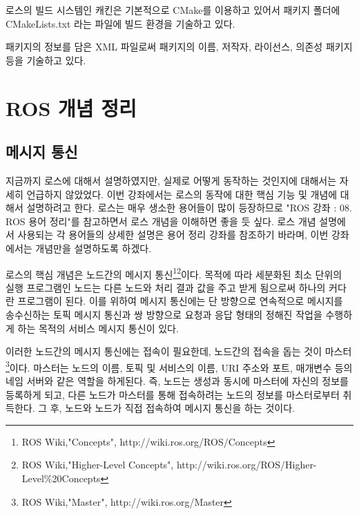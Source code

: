 \begin{definition}
로스의 빌드 시스템인 캐킨은 기본적으로 CMake를 이용하고 있어서 패키지 폴더에 CMakeLists.txt 라는 파일에 빌드 환경을 기술하고 있다.
\end{definition}

\begin{definition}
패키지의 정보를 담은 XML 파일로써 패키지의 이름, 저작자, 라이선스, 의존성 패키지 등을 기술하고 있다.
\end{definition}

\section{ROS 개념 정리}

\subsection{메시지 통신}

지금까지 로스에 대해서 설명하였지만, 실제로 어떻게 동작하는 것인지에 대해서는 자세히 언급하지 않았었다. 이번 강좌에서는 로스의 동작에 대한 핵심 기능 및 개념에 대해서 설명하려고 한다. 로스는 매우 생소한 용어들이 많이 등장하므로 "ROS 강좌 : 08. ROS 용어 정리"를 참고하면서 로스 개념을 이해하면 좋을 듯 싶다. 로스 개념 설명에서 사용되는 각 용어들의 상세한 설명은 용어 정리 강좌를 참조하기 바라며, 이번 강좌에서는 개념만을 설명하도록 하겠다.

로스의 핵심 개념은 노드간의 메시지 통신\footnote{ROS Wiki,"Concepts", http://wiki.ros.org/ROS/Concepts}\footnote{ROS Wiki,"Higher-Level Concepts", http://wiki.ros.org/ROS/Higher-Level\%20Concepts}이다. 목적에 따라 세분화된 최소 단위의 실행 프로그램인 노드는 다른 노드와 처리 결과 값을 주고 받게 됨으로써 하나의 커다란 프로그램이 된다. 이를 위하여 메시지 통신에는 단 방향으로 연속적으로 메시지를 송수신하는 토픽 메시지 통신과 쌍 방향으로 요청과 응답 형태의 정해진 작업을 수행하게 하는 목적의 서비스 메시지 통신이 있다. 

이러한 노드간의 메시지 통신에는 접속이 필요한데, 노드간의 접속을 돕는 것이 마스터\footnote{ROS Wiki,"Master", http://wiki.ros.org/Master}이다. 마스터는 노드의 이름, 토픽 및 서비스의 이름, URI 주소와 포트, 매개변수 등의 네임 서버와 같은 역할을 하게된다. 즉, 노드는 생성과 동시에 마스터에 자신의 정보를 등록하게 되고, 다른 노드가 마스터를 통해 접속하려는 노드의 정보를 마스터로부터 취득한다. 그 후, 노드와 노드가 직접 접속하여 메시지 통신을 하는 것이다. 

